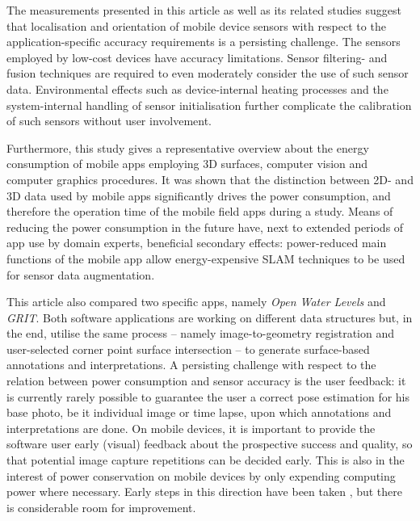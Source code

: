 \documentclass[review]{elsarticle}
\begin{document}
The measurements presented in this article as well as its related studies suggest that localisation and orientation of mobile device sensors with respect to the application-specific accuracy requirements is a persisting challenge. The sensors employed by low-cost devices have accuracy limitations. Sensor filtering- and fusion techniques are required to even moderately consider the use of such sensor data. Environmental effects such as device-internal heating processes and the system-internal handling of sensor initialisation further complicate the calibration of such sensors without user involvement.

Furthermore, this study gives a representative overview about the energy consumption of mobile apps employing 3D surfaces, computer vision and computer graphics procedures. It was shown that the distinction between 2D- and 3D data used by mobile apps significantly drives the power consumption, and therefore the operation time of the mobile field apps during a study. Means of reducing the power consumption in the future have, next to extended periods of app use by domain experts, beneficial secondary effects: power-reduced main functions of the mobile app allow energy-expensive \gls{SLAM} techniques to be used for sensor data augmentation. %

This article also compared two specific apps, namely \textit{Open Water Levels} and \textit{\gls{GRIT}}. Both software applications are working on different data structures but, in the end, utilise the same process -- namely image-to-geometry registration and user-selected corner point surface intersection -- to generate surface-based annotations and interpretations. A persisting challenge with respect to the relation between power consumption and sensor accuracy is the user feedback: it is currently rarely possible to guarantee the user a correct pose estimation for his base photo, be it individual image or time lapse, upon which annotations and interpretations are done. On mobile devices,  it is important to provide the software user early (visual) feedback about the prospective success and quality, so that potential image capture repetitions can be decided early. This is also in the interest of power conservation on mobile devices by only expending computing power where necessary. Early steps in this direction have been taken \cite{Kehl2017_VGC}, but there is considerable room for improvement.
\end{document}
